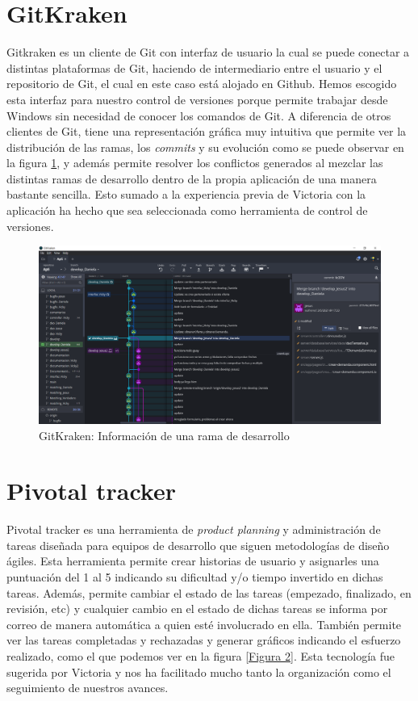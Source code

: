 \documentclass[11pt]{book}
\begin{document}
\section{GitKraken}
Gitkraken es un cliente de Git con interfaz de usuario la cual se puede conectar a distintas plataformas de Git, haciendo de intermediario entre el usuario y el repositorio de Git, el cual en este caso está alojado en Github. Hemos escogido esta interfaz para nuestro control de versiones porque permite trabajar desde Windows sin necesidad de conocer los comandos de Git. A diferencia de otros clientes de Git, tiene una representación gráfica muy intuitiva que permite ver la distribución de las ramas, los \emph{commits} y su evolución como se puede observar en la figura \ref{Figura 1}, y además permite resolver los conflictos generados al mezclar las distintas ramas de desarrollo dentro de la propia aplicación de una manera bastante sencilla. Esto sumado a la experiencia previa de Victoria con la aplicación ha hecho que sea seleccionada como herramienta de control de versiones.
\begin{figure}
	\centering
	\includegraphics[scale=0.4]{gitkraken}
	\caption{GitKraken: Información de una rama de desarrollo}
	\label{Figura 1}
\end{figure}

\section{Pivotal tracker}
Pivotal tracker es una herramienta de \emph{product planning} y administración de tareas diseñada para equipos de desarrollo que siguen metodologías de diseño ágiles.
Esta herramienta permite crear historias de usuario y asignarles una puntuación del 1 al 5 indicando su dificultad y/o tiempo invertido en dichas tareas. Además, permite cambiar el estado de las tareas (empezado, finalizado, en revisión, etc) y cualquier cambio en el estado de dichas tareas se informa por correo de manera automática a quien esté involucrado en ella.
También permite ver las tareas completadas y rechazadas y generar gráficos indicando el esfuerzo realizado, como el que podemos ver en la figura \ref{Figura 2}. Esta tecnología fue sugerida por Victoria y nos ha facilitado mucho tanto la organización como el seguimiento de nuestros avances.
\end{document}
